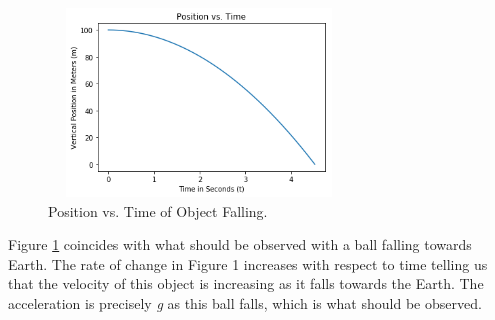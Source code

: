 \documentclass[twocolumn]{article}
\begin{document}
\begin{figure}[ht]
    \centering
    \includegraphics[width=8cm, height=5cm]{Figures/1D Position Plot.png}
    \caption{\small{Position vs. Time of Object Falling.}}
    \label{Fig. 1D Position Plot}
\end{figure}
\par \noindent
Figure \ref{Fig. 1D Position Plot} coincides with what should be observed with a ball falling towards Earth. The rate of change in Figure 1 increases with respect to time telling us that the velocity of this object is increasing as it falls towards the Earth. The acceleration is precisely \textit{g} as this ball falls, which is what should be observed.
\end{document}

